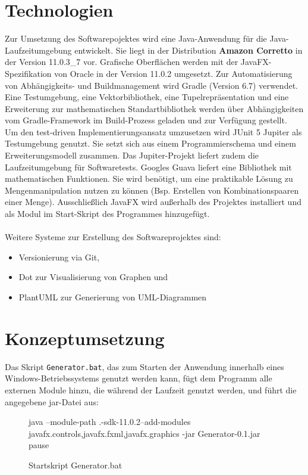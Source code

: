 \section{Technologien}
Zur Umsetzung des Softwarepojektes wird eine Java-Anwendung für die Java-Laufzeitumgebung entwickelt.
Sie liegt in der Distribution \textbf{Amazon Corretto} in der Version 11.0.3\_7 vor.
Grafische Oberflächen werden mit der JavaFX-Spezifikation von Oracle in der Version 11.0.2 umgesetzt.
Zur Automatisierung von Abhängigkeits- und Buildmanagement wird Gradle (Version 6.7) verwendet.
Eine Testumgebung, eine Vektorbibliothek, eine Tupelrepräsentation und eine Erweiterung zur mathematischen
Standartbibliothek werden über Abhängigkeiten vom Gradle-Framework im Build-Prozess geladen und zur Verfügung
gestellt.\\
Um den test-driven Implementierungsansatz umzusetzen wird JUnit 5 Jupiter als Testumgebung genutzt.
Sie setzt sich aus einem Programmierschema und einem Erweiterungsmodell zusammen.
Das Jupiter-Projekt liefert zudem die Laufzeitumgebung für Softwaretests.
Googles Guava liefert eine Bibliothek mit mathematischen Funktionen.
Sie wird benötigt, um eine praktikable Lösung zu Mengenmanipulation nutzen zu können (Bsp. Erstellen
von Kombinationspaaren einer Menge).
Ausschließlich JavaFX wird außerhalb des Projektes installiert und als Modul im Start-Skript des Programmes
hinzugefügt.
\\~\\
Weitere Systeme zur Erstellung des Softwareprojektes sind:
\begin{itemize}
    \item Versionierung via Git,
    \item Dot zur Visualisierung von Graphen und
    \item PlantUML zur Generierung von UML-Diagrammen
\end{itemize}

\section{Konzeptumsetzung}

Das Skript \texttt{Generator.bat}, das zum Starten der Anwendung innerhalb eines Windows-Betriebssystems genutzt werden kann,
fügt dem Programm alle externen Module hinzu, die während der Laufzeit genutzt werden, und führt die angegebene jar-Datei aus:
\begin{figure}[H]
    \centering
    \begin{csource}
        java --module-path .\javafx-sdk-11.0.2\lib --add-modules javafx.controls,javafx.fxml,javafx.graphics -jar Generator-0.1.jar
        pause
    \end{csource}
    \caption{Startskript Generator.bat}
\end{figure}

